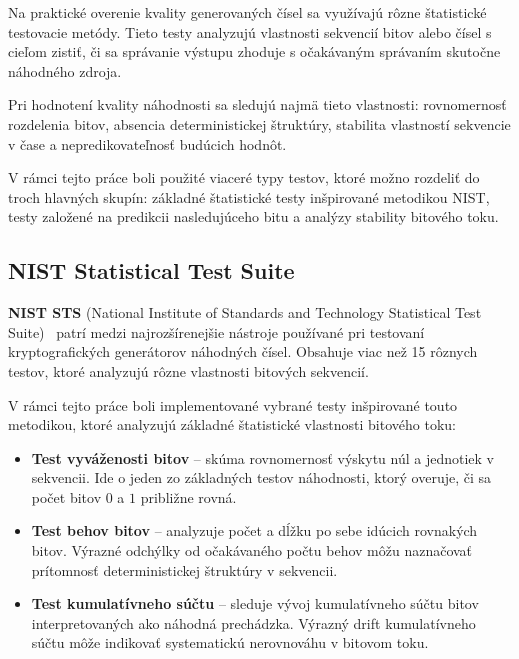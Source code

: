 Na praktické overenie kvality generovaných čísel sa využívajú rôzne štatistické testovacie metódy.
Tieto testy analyzujú vlastnosti sekvencií bitov alebo čísel s cieľom zistiť, či sa správanie výstupu zhoduje s očakávaným správaním skutočne náhodného zdroja.

Pri hodnotení kvality náhodnosti sa sledujú najmä tieto vlastnosti:
rovnomernosť rozdelenia bitov, absencia deterministickej štruktúry, stabilita vlastností sekvencie v čase a nepredikovateľnosť budúcich hodnôt.

V rámci tejto práce boli použité viaceré typy testov, ktoré možno rozdeliť do troch hlavných skupín:
základné štatistické testy inšpirované metodikou NIST, testy založené na predikcii nasledujúceho bitu a analýzy stability bitového toku.

\subsection{NIST Statistical Test Suite}\label{subsec:nist-statistical-test-suite}


\textbf{NIST STS} (National Institute of Standards and Technology Statistical Test Suite)~\cite{NIST_SP800-22} patrí medzi najrozšírenejšie nástroje používané pri testovaní kryptografických generátorov náhodných čísel.
Obsahuje viac než 15 rôznych testov, ktoré analyzujú rôzne vlastnosti bitových sekvencií.

V rámci tejto práce boli implementované vybrané testy inšpirované touto metodikou, ktoré analyzujú základné štatistické vlastnosti bitového toku:

\begin{itemize}
  \item \textbf{Test vyváženosti bitov} – skúma rovnomernosť výskytu núl a jednotiek v sekvencii.
  Ide o jeden zo základných testov náhodnosti, ktorý overuje, či sa počet bitov $0$ a $1$ približne rovná.

  \item \textbf{Test behov bitov} – analyzuje počet a dĺžku po sebe idúcich rovnakých bitov.
  Výrazné odchýlky od očakávaného počtu behov môžu naznačovať prítomnosť deterministickej štruktúry v sekvencii.

  \item \textbf{Test kumulatívneho súčtu} – sleduje vývoj kumulatívneho súčtu bitov interpretovaných ako náhodná prechádzka.
  Výrazný drift kumulatívneho súčtu môže indikovať systematickú nerovnováhu v bitovom toku.
\end{itemize}

